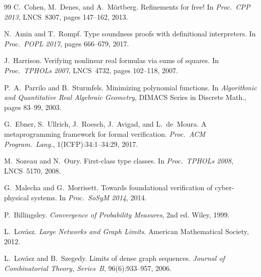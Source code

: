 \documentclass{article}
\begin{document}
\begin{thebibliography}{99}
C.~Cohen, M.~Denes, and A.~M\"{o}rtberg.
\newblock Refinements for free!
\newblock In \textit{Proc.\ CPP 2013}, LNCS~8307, pages 147--162, 2013.

N.~Amin and T.~Rompf.
\newblock Type soundness proofs with definitional interpreters.
\newblock In \textit{Proc.\ POPL 2017}, pages 666--679, 2017.

J.~Harrison.
\newblock Verifying nonlinear real formulas via sums of squares.
\newblock In \textit{Proc.\ TPHOLs 2007}, LNCS~4732, pages 102--118, 2007.

P.~A.~Parrilo and B.~Sturmfels.
\newblock Minimizing polynomial functions.
\newblock In \textit{Algorithmic and Quantitative Real Algebraic Geometry},
  DIMACS Series in Discrete Math., pages 83--99, 2003.

G.~Ebner, S.~Ullrich, J.~Roesch, J.~Avigad, and L.~de~Moura.
\newblock A metaprogramming framework for formal verification.
\newblock \textit{Proc.\ ACM Program.\ Lang.}, 1(ICFP):34:1--34:29, 2017.

M.~Sozeau and N.~Oury.
\newblock First-class type classes.
\newblock In \textit{Proc.\ TPHOLs 2008}, LNCS~5170, 2008.

G.~Malecha and G.~Morrisett.
\newblock Towards foundational verification of cyber-physical systems.
\newblock In \textit{Proc.\ SoSyM 2014}, 2014.

P.~Billingsley.
\newblock \textit{Convergence of Probability Measures}, 2nd ed.
\newblock Wiley, 1999.

L.~Lov\'{a}sz.
\newblock \textit{Large Networks and Graph Limits}.
\newblock American Mathematical Society, 2012.

L.~Lov\'{a}sz and B.~Szegedy.
\newblock Limits of dense graph sequences.
\newblock \textit{Journal of Combinatorial Theory, Series~B}, 96(6):933--957,
  2006.

\end{thebibliography}
\end{document}
